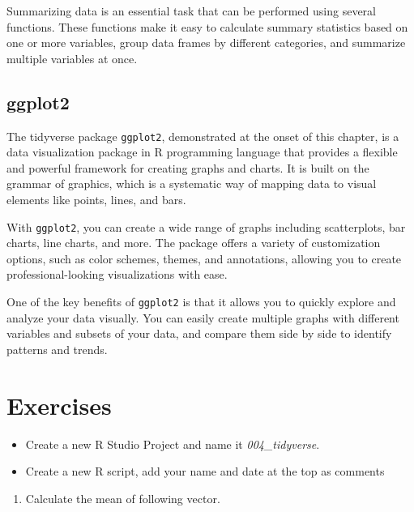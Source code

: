 \documentclass[
]{book}
\providecommand{\tightlist}{%
  \setlength{\itemsep}{0pt}\setlength{\parskip}{0pt}}
\begin{document}
Summarizing data is an essential task that can be performed using several functions. These functions make it easy to calculate summary statistics based on one or more variables, group data frames by different categories, and summarize multiple variables at once.

\hypertarget{ggplot2}{%
\subsection*{ggplot2}\label{ggplot2}}

The tidyverse package \texttt{ggplot2}, demonstrated at the onset of this chapter, is a data visualization package in R programming language that provides a flexible and powerful framework for creating graphs and charts. It is built on the grammar of graphics, which is a systematic way of mapping data to visual elements like points, lines, and bars.

With \texttt{ggplot2}, you can create a wide range of graphs including scatterplots, bar charts, line charts, and more. The package offers a variety of customization options, such as color schemes, themes, and annotations, allowing you to create professional-looking visualizations with ease.

One of the key benefits of \texttt{ggplot2} is that it allows you to quickly explore and analyze your data visually. You can easily create multiple graphs with different variables and subsets of your data, and compare them side by side to identify patterns and trends.

\hypertarget{exercises-3}{%
\section*{Exercises}\label{exercises-3}}

\begin{itemize}
\tightlist
\item
  Create a new R Studio Project and name it \emph{004\_tidyverse}.
\item
  Create a new R script, add your name and date at the top as comments
\end{itemize}

\begin{enumerate}
\def\labelenumi{\arabic{enumi}.}
\tightlist
\item
  Calculate the mean of following vector.
\end{enumerate}
\end{document}
